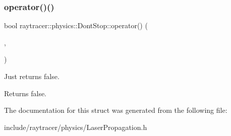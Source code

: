 \subsubsection{\texorpdfstring{operator()()}{operator()()}}
{\footnotesize\ttfamily bool raytracer\+::physics\+::\+Dont\+Stop\+::operator() (\begin{DoxyParamCaption}\item[{const \hyperlink{structraytracer_1_1geometry_1_1Intersection}{geometry\+::\+Intersection} \&}]{,  }\item[{const \hyperlink{structraytracer_1_1physics_1_1LaserRay}{Laser\+Ray} \&}]{ }\end{DoxyParamCaption})}



Just returns false. 

\begin{DoxyReturn}{Returns}
false. 
\end{DoxyReturn}


The documentation for this struct was generated from the following file\+:\begin{DoxyCompactItemize}
\item 
include/raytracer/physics/Laser\+Propagation.\+h\end{DoxyCompactItemize}

